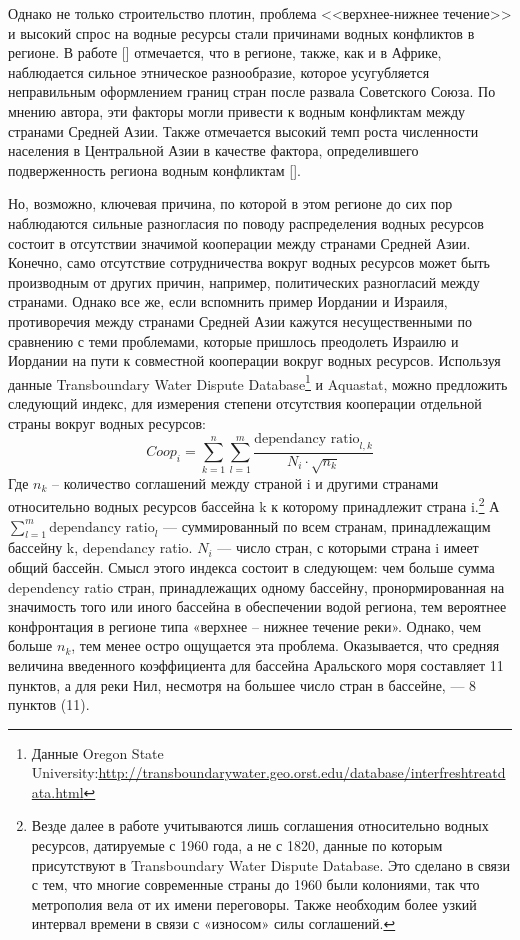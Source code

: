 \documentclass[a4paper, 12pt]{article}
\theoremstyle{plain} %
\theoremstyle{definition} %
\theoremstyle{remark} %
\begin{document}
Однако не только строительство плотин, проблема <<верхнее-нижнее течение>> и высокий спрос на водные ресурсы стали причинами водных конфликтов в регионе. В работе [\cite{mosello}] отмечается, что в регионе, также, как и в Африке, наблюдается сильное этническое разнообразие, которое усугубляется неправильным оформлением границ стран после развала Советского Союза. По мнению автора, эти факторы могли привести к водным конфликтам между странами Средней Азии. Также отмечается высокий темп роста численности населения в Центральной Азии в качестве фактора, определившего подверженность региона водным конфликтам [\cite{mosello}]. 

Но, возможно, ключевая причина, по которой в этом регионе до сих пор наблюдаются сильные разногласия по поводу распределения водных ресурсов состоит в отсутствии значимой кооперации между странами Средней Азии. Конечно, само отсутствие сотрудничества вокруг водных ресурсов может быть производным от других причин, например, политических разногласий между странами. Однако все же, если вспомнить пример Иордании и Израиля, противоречия между странами Средней Азии кажутся несущественными по сравнению с теми проблемами, которые пришлось преодолеть Израилю и Иордании на пути к совместной кооперации вокруг водных ресурсов. Используя данные Transboundary Water Dispute Database\footnote{Данные Oregon State University:\newline \url{http://transboundarywater.geo.orst.edu/database/interfreshtreatdata.html}} и Aquastat, можно предложить следующий индекс, для измерения степени отсутствия кооперации отдельной страны вокруг водных ресурсов:
\begin{equation}\label{eq:1}
Coop_i  = \sum_{k = 1}^{n}\sum_{l = 1}^{m}\frac{\text{dependancy ratio}_{l, k}}{N_i\cdot\sqrt{n_k}}
\end{equation}
Где $n_k$ – количество соглашений между страной i и другими странами относительно водных ресурсов бассейна k к которому принадлежит страна i.\footnote{Везде далее в работе учитываются лишь соглашения относительно водных ресурсов, датируемые с 1960 года, а не с 1820, данные по которым присутствуют в Transboundary Water Dispute Database. Это сделано в связи с тем, что многие современные страны до 1960 были колониями, так что метрополия вела от их имени переговоры. Также необходим более узкий интервал времени в связи с «износом» силы соглашений.} А $\sum_{l = 1}^{m} \text{dependancy ratio}_l$ --- суммированный по всем странам, принадлежащим бассейну k, dependancy ratio. $N_i$ --- число стран, с которыми страна i имеет общий бассейн. Смысл этого индекса состоит в следующем: чем больше сумма dependency ratio стран, принадлежащих одному бассейну, пронормированная на значимость того или иного бассейна в обеспечении водой региона, тем вероятнее конфронтация в регионе типа «верхнее – нижнее течение реки». Однако, чем больше $n_k$, тем менее остро ощущается эта проблема. Оказывается, что средняя величина введенного коэффициента для бассейна Аральского моря составляет 11 пунктов, а для реки Нил, несмотря на большее число стран в бассейне, --- 8 пунктов (11). 
\end{document}
